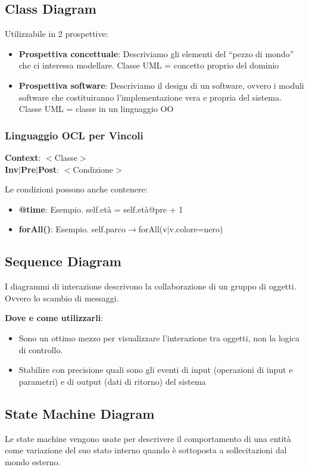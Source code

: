 \subsection{Class Diagram}
Utilizzabile in 2 prospettive:
\begin{itemize}
    \item \textbf{Prospettiva concettuale}: Descriviamo gli elementi del “pezzo di mondo” che ci interessa modellare. Classe UML = concetto proprio del dominio
    \item \textbf{Prospettiva software}: Descriviamo il design di un software, ovvero i moduli software che costituiranno l’implementazione vera e propria del sistema. Classe UML = classe in un linguaggio OO
\end{itemize}

\subsubsection{Linguaggio OCL per Vincoli}
\textbf{Context}: $<$Classe$>$\\
\textbf{Inv$|$Pre$|$Post}: $<$Condizione$>$

\vspace{4mm}
\noindent Le condizioni possono anche contenere:
\begin{itemize}
    \item \textbf{@time}: Esempio. self.età = self.età@pre + 1
    \item \textbf{forAll()}: Esempio. self.parco$\rightarrow$forAll(v$|$v.colore=nero)
\end{itemize}

\subsection{Sequence Diagram}
I diagrammi di interazione descrivono la collaborazione di un gruppo di oggetti. Ovvero lo scambio di messaggi.

\vspace{2mm}
\noindent \textbf{Dove e come utilizzarli}:
\begin{itemize}
    \item Sono un ottimo mezzo per visualizzare l’interazione tra oggetti, non la logica di controllo.
    \item Stabilire con precisione quali sono gli eventi di input (operazioni di input e parametri) e di output (dati di ritorno) del sistema
\end{itemize}

\break
\subsection{State Machine Diagram}
Le state machine vengono usate per descrivere il comportamento di una entità come variazione del suo stato interno quando è sottoposta a sollecitazioni dal mondo esterno.

